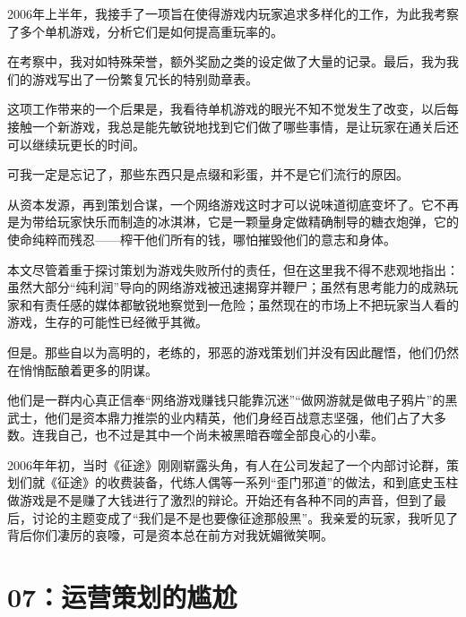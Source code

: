 \documentclass{article}
\begin{document}
2006年上半年，我接手了一项旨在使得游戏内玩家追求多样化的工作，为此我考察了多个单机游戏，分析它们是如何提高重玩率的。



在考察中，我对如特殊荣誉，额外奖励之类的设定做了大量的记录。最后，我为我们的游戏写出了一份繁复冗长的特别勋章表。



这项工作带来的一个后果是，我看待单机游戏的眼光不知不觉发生了改变，以后每接触一个新游戏，我总是能先敏锐地找到它们做了哪些事情，是让玩家在通关后还可以继续玩更长的时间。



可我一定是忘记了，那些东西只是点缀和彩蛋，并不是它们流行的原因。



从资本发源，再到策划合谋，一个网络游戏这时才可以说味道彻底变坏了。它不再是为带给玩家快乐而制造的冰淇淋，它是一颗量身定做精确制导的糖衣炮弹，它的使命纯粹而残忍——榨干他们所有的钱，哪怕摧毁他们的意志和身体。



本文尽管着重于探讨策划为游戏失败所付的责任，但在这里我不得不悲观地指出：虽然大部分“纯利润”导向的网络游戏被迅速揭穿并鞭尸；虽然有思考能力的成熟玩家和有责任感的媒体都敏锐地察觉到一危险；虽然现在的市场上不把玩家当人看的游戏，生存的可能性已经微乎其微。



但是。那些自以为高明的，老练的，邪恶的游戏策划们并没有因此醒悟，他们仍然在悄悄酝酿着更多的阴谋。



他们是一群内心真正信奉“网络游戏赚钱只能靠沉迷”“做网游就是做电子鸦片”的黑武士，他们是资本鼎力推崇的业内精英，他们身经百战意志坚强，他们占了大多数。连我自己，也不过是其中一个尚未被黑暗吞噬全部良心的小辈。



2006年年初，当时《征途》刚刚崭露头角，有人在公司发起了一个内部讨论群，策划们就《征途》的收费装备，代练人偶等一系列“歪门邪道”的做法，和到底史玉柱做游戏是不是赚了大钱进行了激烈的辩论。开始还有各种不同的声音，但到了最后，讨论的主题变成了“我们是不是也要像征途那般黑”。我亲爱的玩家，我听见了背后你们凄厉的哀嚎，可是资本总在前方对我妩媚微笑啊。





{\centering\section*{07：运营策划的尴尬}}
\end{document}
